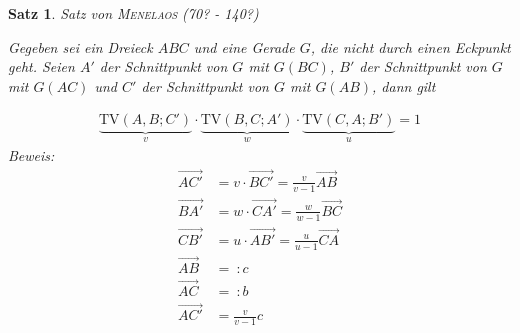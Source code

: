 \documentclass[%
a4paper,
11pt,		%
twoside,
]
{scrartcl}
\newcommand{\TV}{\text{TV}}
\newcommand{\ora}{\overrightarrow}
\theoremstyle{plain}
\theoremstyle{plain}
\newtheorem{mysatz}[mydef]{Satz}
\theoremstyle{plain}
\theoremstyle{plain}
\theoremstyle{plain}
\begin{document}
\begin{mysatz}
    Satz von \textsc{Menelaos} (70? - 140?)

    \begin{minipage}{0.45\textwidth}
        Gegeben sei ein Dreieck $ABC$ und eine Gerade $G$, die nicht durch einen Eckpunkt geht. Seien $A'$ der Schnittpunkt von $G$ mit $G(BC)$, $B'$ der Schnittpunkt von $G$ mit $G(AC)$ und $C'$ der Schnittpunkt von $G$ mit $G(AB)$, dann gilt
    \end{minipage}
    \begin{minipage}{0.55\textwidth}
        \begin{center}
        \end{center}
    \end{minipage}
    \begin{align*}
        \underbrace{\TV(A,B;C')}_{v}
        \cdot
        \underbrace{\TV(B,C;A')}_{w}
        \cdot
        \underbrace{\TV(C,A;B')}_{u}
        = 1
    \end{align*}
    \textit{Beweis:}
    \begin{align*}
        \ora{AC'} & = v \cdot \ora{BC'} = \frac{v}{v-1} \ora{AB}\\
        \ora{BA'} & = w \cdot \ora{CA'} = \frac{w}{w-1} \ora{BC}\\
        \ora{CB'} & = u \cdot \ora{AB'} = \frac{u}{u-1} \ora{CA}\\
        \ora{AB} & =\ : c\\
        \ora{AC} & =\ : b\\
        \ora{AC'} & = \frac{v}{v-1} c\\

\end{align*}
\end{mysatz}
\end{document}
